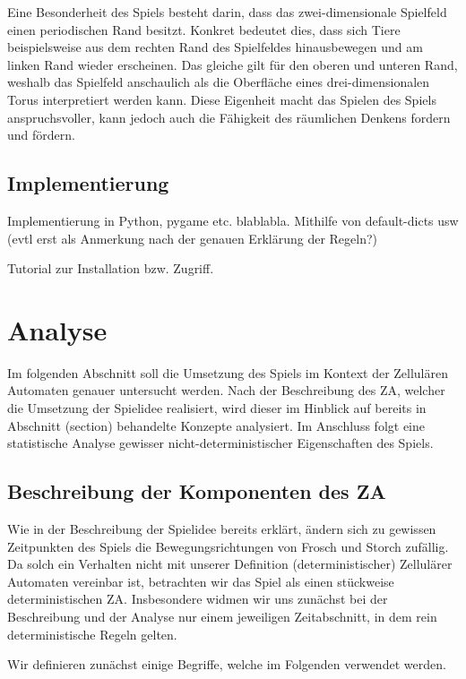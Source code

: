 Eine Besonderheit des Spiels besteht darin, dass das zwei-dimensionale Spielfeld einen periodischen Rand besitzt. Konkret bedeutet dies, dass sich Tiere beispielsweise aus dem rechten Rand des Spielfeldes hinausbewegen und am linken Rand wieder erscheinen. Das gleiche gilt für den oberen und unteren Rand, weshalb das Spielfeld anschaulich als die Oberfläche eines drei-dimensionalen Torus interpretiert werden kann. Diese Eigenheit macht das Spielen des Spiels anspruchsvoller, kann jedoch auch die Fähigkeit des räumlichen Denkens fordern und fördern.

\subsection{Implementierung}

Implementierung in Python, pygame etc. blablabla. Mithilfe von default-dicts usw (evtl erst als Anmerkung nach der genauen Erklärung der Regeln?)

Tutorial zur Installation bzw. Zugriff.




\section{Analyse}

Im folgenden Abschnitt soll die Umsetzung des Spiels im Kontext der Zellulären Automaten genauer untersucht werden. Nach der Beschreibung des ZA, welcher die Umsetzung der Spielidee realisiert, wird dieser im Hinblick auf bereits in Abschnitt (section) behandelte Konzepte analysiert. Im Anschluss folgt eine statistische Analyse gewisser nicht-deterministischer Eigenschaften des Spiels.

\subsection{Beschreibung der Komponenten des ZA}

Wie in der Beschreibung der Spielidee bereits erklärt, ändern sich zu gewissen Zeitpunkten des Spiels die Bewegungsrichtungen von Frosch und Storch zufällig. Da solch ein Verhalten nicht mit unserer Definition (deterministischer) Zellulärer Automaten vereinbar ist, betrachten wir das Spiel als einen stückweise deterministischen ZA. Insbesondere widmen wir uns zunächst bei der Beschreibung und der Analyse nur einem jeweiligen Zeitabschnitt, in dem rein deterministische Regeln gelten.

Wir definieren zunächst einige Begriffe, welche im Folgenden verwendet werden.


